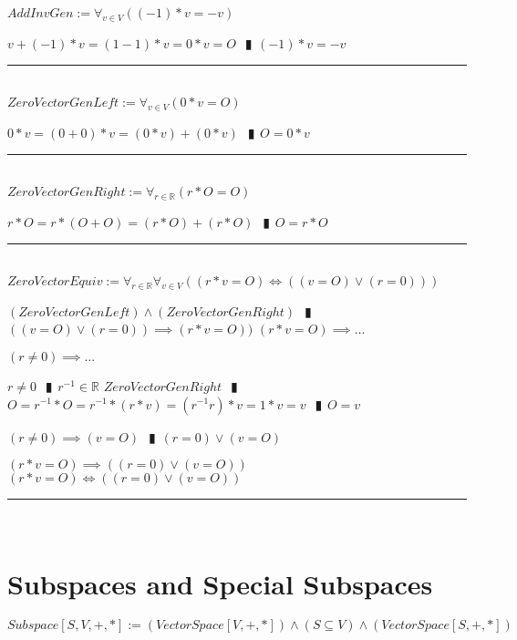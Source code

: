 \documentclass{book}
\newcommand{\abr}{:=}
\newcommand{\pipe}{$\phantom{(}\vrectangleblack\phantom{)}$}
\newcommand{\pr}[1]{\left(#1\right)}
\begin{document}
$AddInvGen \abr \forall_{v \in V}\pr{(-1) * v = -v}$
\begin{enumerate}
  \lit $v + (-1) * v = (1 - 1) * v = 0 * v = O$ \pipe $(-1) * v = -v$
\end{enumerate} \vspace{.75mm} \hrule \vspace{.75mm} \ \\ 

$ZeroVectorGenLeft \abr \forall_{v \in V}(0 * v = O)$
\begin{enumerate}
  \lit $0 * v = (0 + 0) * v = (0 * v) + (0 * v)$ \pipe $O = 0 * v$
\end{enumerate} \vspace{.75mm} \hrule \vspace{.75mm} \ \\ 

$ZeroVectorGenRight \abr \forall_{r \in \mathbb{R}}(r * O = O)$
\begin{enumerate}
  \lit $r * O = r * (O + O) = (r * O) + (r * O)$ \pipe $O = r * O$
\end{enumerate} \vspace{.75mm} \hrule \vspace{.75mm} \ \\ 

$ZeroVectorEquiv \abr \forall_{r \in \mathbb{R}} \forall_{v \in V}\pr{(r * v = O) \iff \pr{(v = O) \lor (r = 0)}}$
\begin{enumerate}
  \lit $(ZeroVectorGenLeft) \land (ZeroVectorGenRight)$ \pipe $\pr{(v = O) \lor (r = 0)} \implies (r * v = O))$
  \lit $(r * v = O) \implies \ldots$
  \begin{enumerate}
    \lit $(r \neq 0) \implies \ldots$
      \begin{enumerate}
        \lit $r \neq 0$ \pipe $r^{-1} \in \mathbb{R}$
        \lit $ZeroVectorGenRight$ \pipe $O = r^{-1} * O = r^{-1} * (r * v) = (r^{-1} r) * v = 1 * v = v$ \pipe $O = v$
      \end{enumerate}
      \lit $(r \neq 0) \implies (v = O)$ \pipe $(r = 0) \lor (v = O)$
  \end{enumerate}
  \lit $(r * v = O) \implies \pr{(r = 0) \lor (v = O)}$
  \lit $(r * v = O) \iff \pr{(r = 0) \lor (v = O)}$
\end{enumerate} \vspace{.75mm} \hrule \vspace{.75mm} \ \\ 


\section{Subspaces and Special Subspaces}
$Subspace[S, V, +, *] \abr (VectorSpace[V, +, *]) \land (S \subseteq V) \land (VectorSpace[S, +, *])$ \\
\end{document}
